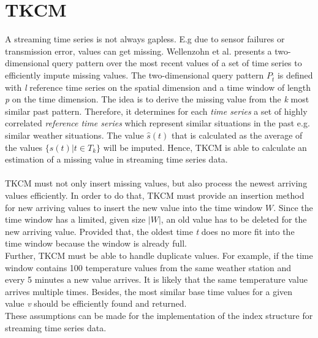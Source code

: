 \documentclass[abstracton,12pt]{scrreprt}
\begin{document}
\section{TKCM}
A streaming time series is not always gapless. E.g due to sensor failures or transmission error, values can get missing. Wellenzohn et al.\cite{BScT} presents a two-dimensional query pattern over the most recent values of a set of time series to efficiently impute missing values. The two-dimensional query pattern $P_{\bar{t}}$ is defined with \emph{l} reference time series on the spatial dimension and a time window of length \emph{p} on the time dimension. The idea is to derive the missing value from the \emph{k} most similar past pattern. Therefore, it determines for each \emph{time series} a set of highly correlated \emph{reference time series} which represent similar situations in the past e.g. similar weather situations. The value $\hat{s}(t)$ that is calculated as the average of the values $\{s(t) | t \in T_k\}$ will be imputed. Hence, TKCM is able to calculate an estimation of a missing value in streaming time series data. \\ \\
TKCM must not only insert missing values, but also process the newest arriving values efficiently. In order to do that, TKCM must provide an insertion method for new arriving values to insert the new value into the time window $W$. Since the time window has a limited, given size $|W|$, an old value has to be deleted for the new arriving value. Provided that, the oldest time \emph{t} does no more fit into the time window because the window is already full. \\
Further, TKCM must be able to handle duplicate values. For example, if the time window contains 100 temperature values from the same weather station and every 5 minutes a new value arrives. It is likely that the same temperature value arrives multiple times. 
Besides, the most similar base time values for a given value \emph{v} should be efficiently found and returned.\\
These assumptions can be made for the implementation of the index structure for streaming time series data.
\end{document}
